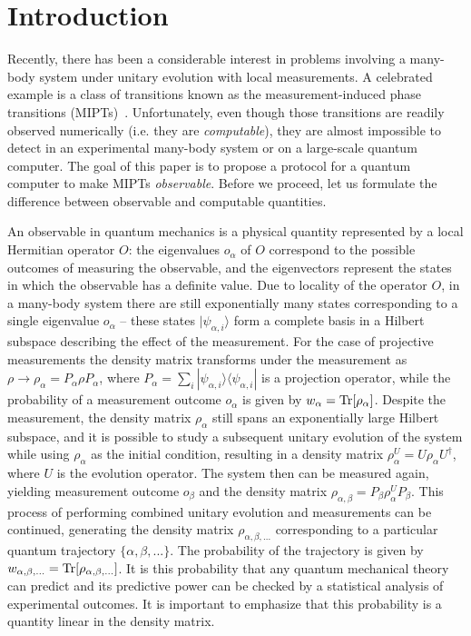 \documentclass[%
 reprint,
 superscriptaddress,
 amsmath,amssymb,
prx,
]{revtex4-2}\href{\href{}{}}{}
\begin{document}
\maketitle

\section{\label{sec:Intro}Introduction}

Recently, there has been a considerable interest in problems involving a many-body system under unitary evolution with local measurements.
A celebrated example is a class of transitions known as the measurement-induced phase transitions (MIPTs)~\cite{Potter2022, Fisher2023}.
Unfortunately, even though those transitions are readily observed numerically (i.e. they are \textit{computable}), they are almost impossible to detect in an experimental many-body system or on a large-scale quantum computer.
The goal of this paper is to propose a protocol for a quantum computer to make MIPTs \textit{observable}.
Before we proceed, let us formulate the difference between observable and computable quantities.

An observable in quantum mechanics is a physical quantity represented by a local Hermitian operator $O$: the eigenvalues $o_{\alpha}$ of $O$ correspond to the possible outcomes of measuring the observable, and the eigenvectors represent the states in which the observable has a definite value.
Due to locality of the operator $O$, in a many-body system there are still exponentially many states corresponding to a single eigenvalue $o_{\alpha}$ -- these states $|\psi_{\alpha,i}\rangle$ form a complete basis in a Hilbert subspace describing the effect of the measurement.
For the case of projective measurements the density matrix transforms under the measurement as $\rho \to \rho_{\alpha} = P_{\alpha}\rho P_{\alpha}$, where $P_{\alpha}=\sum_i |\psi_{\alpha,i}\rangle \langle \psi_{\alpha,i}|$ is a projection operator, while the probability of a measurement outcome $o_{\alpha}$ is given by $w_{\alpha}=\Tr[\rho_{\alpha}]$.
Despite the measurement, the density matrix $\rho_{\alpha}$ still spans an exponentially large Hilbert subspace, and it is possible to study a subsequent unitary evolution of the system while using $\rho_{\alpha}$ as the initial condition, resulting in a density matrix $\rho_{\alpha}^U = U\rho_{\alpha} U^{\dag}$, where $U$ is the evolution operator.
The system then can be measured again, yielding measurement outcome $o_{\beta}$ and the density matrix $\rho_{\alpha,\beta} = P_{\beta}\rho_{\alpha}^U P_{\beta}$.
This process of performing combined unitary evolution and measurements can be continued, generating the density matrix $\rho_{\alpha,\beta,...}$ corresponding to a particular quantum trajectory $\{\alpha,\beta,...\}$.
The probability of the trajectory is given by $w_{\alpha,\beta,...}=\Tr[\rho_{\alpha,\beta,...}]$.
It is this probability that any quantum mechanical theory can predict and its predictive power can be checked by a statistical analysis of experimental outcomes.
It is important to emphasize that this probability is a quantity linear in the density matrix.
\end{document}
